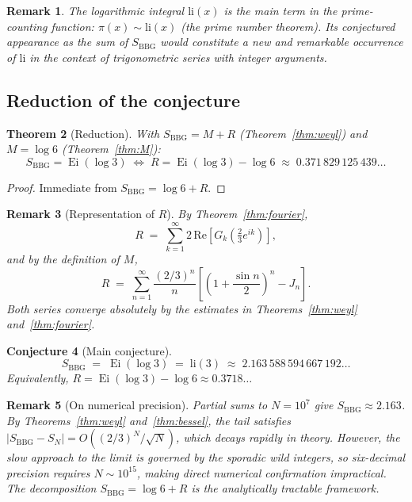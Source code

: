 \documentclass[12pt]{amsart}
\newtheorem{theorem}{Theorem}[section]
\newtheorem{remark}[theorem]{Remark}
\newtheorem{conjecture}[theorem]{Conjecture}
\DeclareMathOperator{\Ei}{Ei}
\newcommand{\li}{\mathrm{li}}
\begin{document}
\begin{remark}\label{rem:li-NT}
The logarithmic integral $\li(x)$ is the main term in the
prime-counting function: $\pi(x)\sim\li(x)$ (the prime number
theorem).  Its conjectured appearance as the sum of $S_{\mathrm{BBG}}$
would constitute a new and remarkable occurrence of $\li$ in the
context of trigonometric series with integer arguments.
\end{remark}

\subsection{Reduction of the conjecture}

\begin{theorem}[Reduction]\label{thm:reduction}
With $S_{\mathrm{BBG}}=M+R$ (Theorem~\ref{thm:weyl}) and $M=\log 6$
(Theorem~\ref{thm:M}):
\begin{equation}\label{eq:reduction}
  S_{\mathrm{BBG}} = \Ei(\log 3)
  \;\iff\;
  R = \Ei(\log 3)-\log 6
    \;\approx\; 0.371\,829\,125\,439\ldots
\end{equation}
\end{theorem}

\begin{proof}
Immediate from $S_{\mathrm{BBG}}=\log 6+R$.
\end{proof}

\begin{remark}[Representation of $R$]\label{rem:R-rep}
By Theorem~\ref{thm:fourier},
\[
  R \;=\; \sum_{k=1}^{\infty}
          2\,\mathrm{Re}\!\left[G_k\!\!\left(\tfrac{2}{3}e^{ik}\right)\right],
\]
and by the definition of $M$,
\[
  R \;=\; \sum_{n=1}^{\infty}\frac{(2/3)^n}{n}
          \!\left[\left(1+\frac{\sin n}{2}\right)^{\!n}-J_n\right].
\]
Both series converge absolutely by the estimates in
Theorems~\ref{thm:weyl} and~\ref{thm:fourier}.
\end{remark}

\begin{conjecture}[Main conjecture]\label{conj:main}
\[
  S_{\mathrm{BBG}} \;=\; \Ei(\log 3) \;=\; \li(3)
  \;\approx\; 2.163\,588\,594\,667\,192\ldots
\]
Equivalently, $R=\Ei(\log 3)-\log 6\approx 0.3718\ldots$
\end{conjecture}

\begin{remark}[On numerical precision]\label{rem:numerics}
Partial sums to $N=10^7$ give $S_{\mathrm{BBG}}\approx 2.163$.
By Theorems~\ref{thm:weyl} and~\ref{thm:bessel}, the tail satisfies
$|S_{\mathrm{BBG}}-S_N|=O((2/3)^N/\sqrt{N})$, which decays rapidly
in theory.  However, the slow approach to the limit is governed by
the sporadic wild integers, so six-decimal precision requires
$N\sim 10^{15}$, making direct numerical confirmation impractical.
The decomposition $S_{\mathrm{BBG}}=\log 6+R$ is the analytically
tractable framework.
\end{remark}
\end{document}
